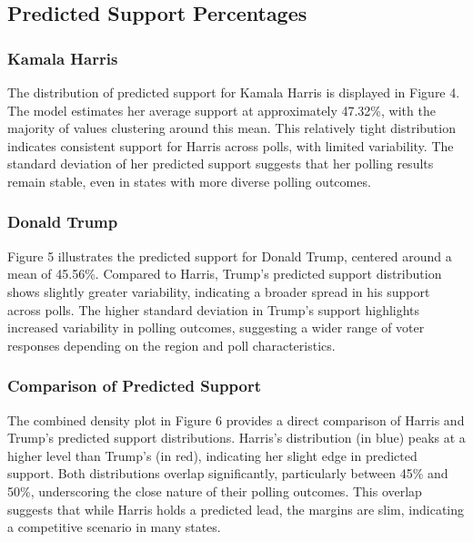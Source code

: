 \documentclass[
  letterpaper,
  DIV=11,
  numbers=noendperiod]{scrartcl}
\begin{document}
\subsection{Predicted Support
Percentages}\label{predicted-support-percentages}

\subsubsection{Kamala Harris}\label{kamala-harris}

The distribution of predicted support for Kamala Harris is displayed in
Figure 4. The model estimates her average support at approximately
47.32\%, with the majority of values clustering around this mean. This
relatively tight distribution indicates consistent support for Harris
across polls, with limited variability. The standard deviation of her
predicted support suggests that her polling results remain stable, even
in states with more diverse polling outcomes.

\subsubsection{Donald Trump}\label{donald-trump}

Figure 5 illustrates the predicted support for Donald Trump, centered
around a mean of 45.56\%. Compared to Harris, Trump's predicted support
distribution shows slightly greater variability, indicating a broader
spread in his support across polls. The higher standard deviation in
Trump's support highlights increased variability in polling outcomes,
suggesting a wider range of voter responses depending on the region and
poll characteristics.

\subsubsection{Comparison of Predicted
Support}\label{comparison-of-predicted-support}

The combined density plot in Figure 6 provides a direct comparison of
Harris and Trump's predicted support distributions. Harris's
distribution (in blue) peaks at a higher level than Trump's (in red),
indicating her slight edge in predicted support. Both distributions
overlap significantly, particularly between 45\% and 50\%, underscoring
the close nature of their polling outcomes. This overlap suggests that
while Harris holds a predicted lead, the margins are slim, indicating a
competitive scenario in many states.
\end{document}
